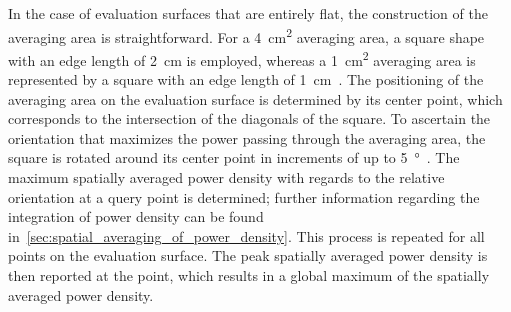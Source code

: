 In the case of evaluation surfaces that are entirely flat, the construction of the averaging area is straightforward.
For a \SI{4}{\cm\squared} averaging area, a square shape with an edge length of \SI{2}{\cm} is employed, whereas a \SI{1}{\cm\squared} averaging area is represented by a square with an edge length of \SI{1}{\cm}~\cite{IEEE2021Guide}.
The positioning of the averaging area on the evaluation surface is determined by its center point, which corresponds to the intersection of the diagonals of the square.
To ascertain the orientation that maximizes the power passing through the averaging area, the square is rotated around its center point in increments of up to \SI{5}{\degree}~\cite{IEC63195-2-2022}.
The maximum spatially averaged power density with regards to the relative orientation at a query point is determined; further information regarding the integration of power density can be found in~\cref{sec:spatial_averaging_of_power_density}.
This process is repeated for all points on the evaluation surface.
The peak spatially averaged power density is then reported at the point, which results in a global maximum of the spatially averaged power density.

